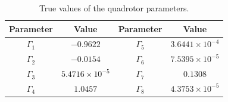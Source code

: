 \documentclass[peerreview]{IEEEtran}
\begin{document}
\begin{table}[H]
	\renewcommand{\arraystretch}{1.3}
	\caption{True values of the quadrotor parameters.}
	\begin{center}
	\begin{tabular}{c c c c}
	\hline
	Parameter & Value & Parameter & Value  \\
	\hline
	$\Gamma_1$ & $-0.9622$ & $\Gamma_5$ & $3.6441\times10^{-4}$ \\

	$\Gamma_2$ & $-0.0154$ & $\Gamma_6$ & $7.5395\times10^{-5}$ \\

	$\Gamma_3$ &$5.4716\times10^{-5}$ & $\Gamma_7$ & $0.1308$ \\

	$\Gamma_4$ & $1.0457$ & $\Gamma_8$ & $4.3753\times10^{-5}$ \\
	\hline
	\end{tabular}
	\label{tab:true_parameters}
	\end{center}
\end{table}
\end{document}
